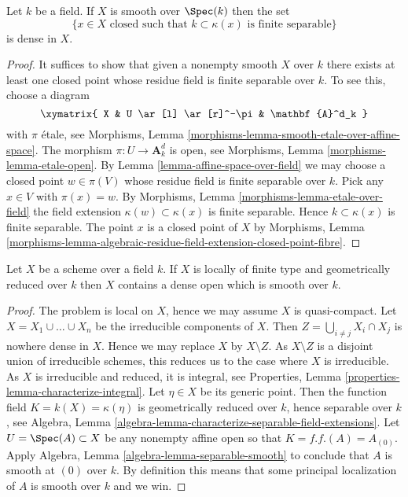 \begin{lemma}
\label{lemma-smooth-separable-closed-points-dense}
Let $k$ be a field. If $X$ is smooth over $\Spec(k)$ then
the set
$$
\{x \in X\text{ closed such that }k \subset \kappa(x)
\text{ is finite separable}\}
$$
is dense in $X$.
\end{lemma}

\begin{proof}
It suffices to show that given a nonempty smooth $X$ over $k$
there exists at least one closed point whose residue field is
finite separable over $k$. To see this, choose a diagram
$$
\xymatrix{
X & U \ar[l] \ar[r]^-\pi & \mathbf{A}^d_k
}
$$
with $\pi$ \'etale, see
Morphisms, Lemma \ref{morphisms-lemma-smooth-etale-over-affine-space}.
The morphism $\pi : U \to \mathbf{A}^d_k$ is open, see
Morphisms, Lemma \ref{morphisms-lemma-etale-open}.
By
Lemma \ref{lemma-affine-space-over-field}
we may choose a closed point $w \in \pi(V)$ whose residue field is
finite separable over $k$. Pick any $x \in V$ with $\pi(x) = w$. By
Morphisms, Lemma \ref{morphisms-lemma-etale-over-field}
the field extension $\kappa(w) \subset \kappa(x)$ is finite separable.
Hence $k \subset \kappa(x)$ is finite separable. The point $x$ is a
closed point of $X$ by
Morphisms, Lemma
\ref{morphisms-lemma-algebraic-residue-field-extension-closed-point-fibre}.
\end{proof}

\begin{lemma}
\label{lemma-geometrically-reduced-dense-smooth-open}
Let $X$ be a scheme over a field $k$.
If $X$ is locally of finite type and geometrically reduced over $k$
then $X$ contains a dense open which is smooth over $k$.
\end{lemma}

\begin{proof}
The problem is local on $X$, hence we may assume $X$ is quasi-compact.
Let $X = X_1 \cup \ldots \cup X_n$ be the irreducible components of $X$.
Then $Z = \bigcup_{i \not = j} X_i \cap X_j$ is nowhere dense in $X$.
Hence we may replace $X$ by $X \setminus Z$. As $X \setminus Z$ is a
disjoint union of irreducible schemes, this reduces us to the case
where $X$ is irreducible. As $X$ is irreducible and reduced, it is
integral, see
Properties, Lemma \ref{properties-lemma-characterize-integral}.
Let $\eta \in X$ be its generic point.
Then the function field $K = k(X) = \kappa(\eta)$ is geometrically
reduced over $k$, hence separable over $k$, see
Algebra, Lemma \ref{algebra-lemma-characterize-separable-field-extensions}.
Let $U = \Spec(A) \subset X$ be any nonempty affine open
so that $K = f.f.(A) = A_{(0)}$. Apply
Algebra, Lemma \ref{algebra-lemma-separable-smooth}
to conclude that $A$ is smooth at $(0)$ over $k$.
By definition this means that some principal localization
of $A$ is smooth over $k$ and we win.
\end{proof}


